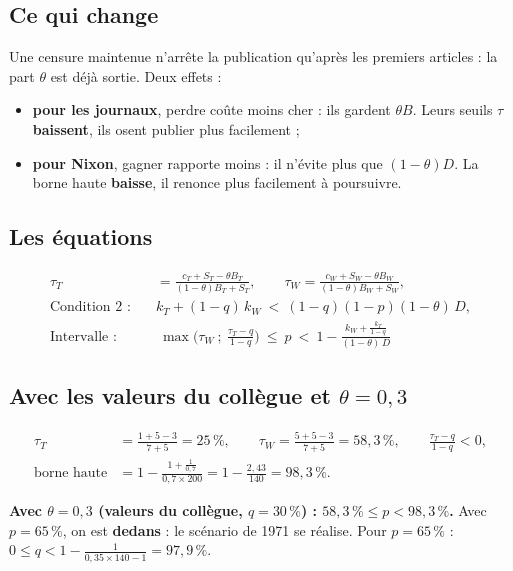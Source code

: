 \documentclass[11pt,a4paper]{article}
\theoremstyle{definition}
\begin{document}
\subsection{Ce qui change}
Une censure maintenue n'arrête la publication qu'après les premiers articles : la part $\theta$ est déjà sortie. Deux effets :
\begin{itemize}[leftmargin=*,itemsep=2pt]
\item \textbf{pour les journaux}, perdre coûte moins cher : ils gardent $\theta B$. Leurs seuils $\tau$ \textbf{baissent}, ils osent publier plus facilement ;
\item \textbf{pour Nixon}, gagner rapporte moins : il n'évite plus que $(1-\theta)D$. La borne haute \textbf{baisse}, il renonce plus facilement à poursuivre.
\end{itemize}

\subsection{Les équations}
\begin{align*}
\tau_T &= \frac{c_T+S_T-\theta B_T}{(1-\theta)B_T+S_T}, \qquad \tau_W=\frac{c_W+S_W-\theta B_W}{(1-\theta)B_W+S_W},\\[4pt]
\text{Condition 2 :}\quad & k_T+(1-q)\,k_W\ <\ (1-q)(1-p)(1-\theta)\,D,\\[4pt]
\boxed{\text{Intervalle :}}\quad & \boxed{\ \max\!\Big(\tau_W\ ;\ \frac{\tau_T-q}{1-q}\Big)\ \le\ p\ <\ 1-\frac{k_W+\frac{k_T}{1-q}}{(1-\theta)\,D}\ }
\end{align*}

\subsection{Avec les valeurs du collègue et \texorpdfstring{$\theta=0,3$}{theta = 0,3}}
\begin{align*}
\tau_T &= \frac{1+5-3}{7+5}=25\,\%, \qquad \tau_W=\frac{5+5-3}{7+5}=58,3\,\%, \qquad \frac{\tau_T-q}{1-q}<0,\\[4pt]
\text{borne haute} &= 1-\frac{1+\frac{1}{0,7}}{0,7\times200}=1-\frac{2,43}{140}=98,3\,\%.
\end{align*}
\begin{reponse}
\textbf{Avec $\theta=0,3$ (valeurs du collègue, $q=30\,\%$) : $58,3\,\%\le p<98,3\,\%$.} Avec $p=65\,\%$, on est \textbf{dedans} : le scénario de 1971 se réalise. Pour $p=65\,\%$ : $0\le q<1-\frac{1}{0,35\times140-1}=97,9\,\%$.
\end{reponse}
\end{document}
